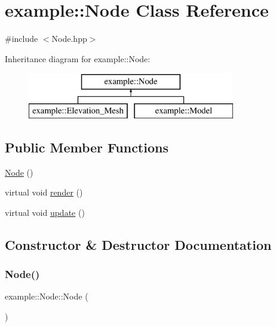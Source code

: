 \hypertarget{classexample_1_1_node}{}\section{example\+:\+:Node Class Reference}
\label{classexample_1_1_node}


{\ttfamily \#include $<$Node.\+hpp$>$}

Inheritance diagram for example\+:\+:Node\+:\begin{figure}[H]
\begin{center}
\leavevmode
\includegraphics[height=2.000000cm]{classexample_1_1_node}
\end{center}
\end{figure}
\subsection*{Public Member Functions}
\begin{DoxyCompactItemize}
\item 
\mbox{\hyperlink{classexample_1_1_node_a27eff42d7d0078761627f2fa5ede06bc}{Node}} ()
\item 
virtual void \mbox{\hyperlink{classexample_1_1_node_a6e9c30ac62693f7fa0a4080202df45df}{render}} ()
\item 
virtual void \mbox{\hyperlink{classexample_1_1_node_a6d570b9e13063686b8057d8f561e196e}{update}} ()
\end{DoxyCompactItemize}


\subsection{Constructor \& Destructor Documentation}
\mbox{\label{classexample_1_1_node_a27eff42d7d0078761627f2fa5ede06bc}} 
\subsubsection{\texorpdfstring{Node()}{Node()}}
{\footnotesize\ttfamily example\+::\+Node\+::\+Node (\begin{DoxyParamCaption}{ }\end{DoxyParamCaption})\hspace{0.3cm}{\ttfamily [inline]}}



